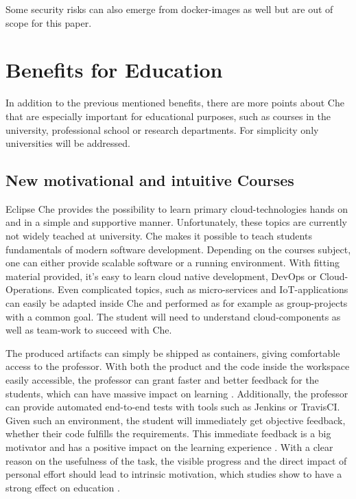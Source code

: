 \documentclass[utf8]{lni}
\begin{document}
Some security risks can also emerge from docker-images as well \cite{PE13} but are out of scope for this paper.

\section{Benefits for Education}
\label{sec:EvalEdu}
In addition to the previous mentioned benefits, there are more points about Che that are especially important for educational purposes, such as courses in the university, professional school or research departments.
For simplicity only universities will be addressed.
\subsection{New motivational and intuitive Courses}
Eclipse Che provides the possibility to learn primary cloud-technologies hands on and in a simple and supportive manner. 
Unfortunately, these topics are currently not widely teached at university.
Che makes it possible to teach students fundamentals of modern software development.
Depending on the courses subject, one can either provide scalable software or a running environment. 
With fitting material provided, it's easy to learn cloud native development, DevOps or Cloud-Operations. 
Even complicated topics, such as micro-services and IoT-applications can easily be adapted inside Che \cite{IV18} and performed as for example as group-projects with a common goal. 
The student will need to understand cloud-components as well as team-work to succeed with Che. 

The produced artifacts can simply be shipped as containers, giving comfortable access to the professor. 
With both the product and the code inside the workspace easily accessible, the professor can grant faster and better feedback for the students, which can have massive impact on learning \cite{HU95}\cite{HU18}.
Additionally, the professor can provide automated end-to-end tests with tools such as Jenkins or TravisCI. 
Given such an environment, the student will immediately get objective feedback, whether their code fulfills the requirements. 
This immediate feedback is a big motivator and has a positive impact on the learning experience \cite{FI05}. 
With a clear reason on the usefulness of the task, the visible progress and the direct impact of personal effort should lead to intrinsic motivation, which studies show to have a strong effect on education \cite{DECI93}. 
\end{document}
